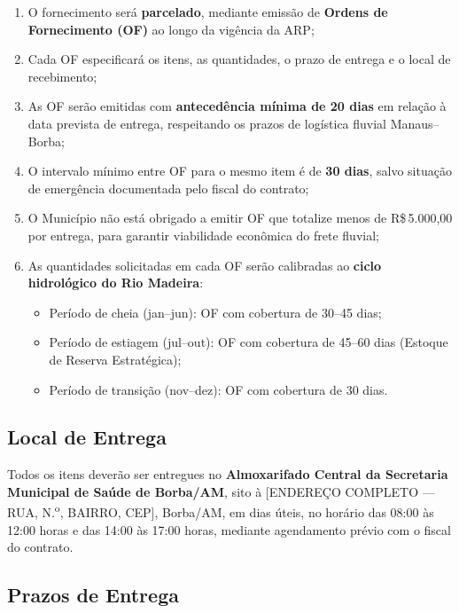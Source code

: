 \documentclass[12pt,a4paper]{article}
\newcommand{\Rs}{R\$\,}
\begin{document}
\begin{enumerate}
  \item O fornecimento será \textbf{parcelado}, mediante emissão de \textbf{Ordens de
    Fornecimento (OF)} ao longo da vigência da ARP;

  \item Cada OF especificará os itens, as quantidades, o prazo de entrega e o local de
    recebimento;

  \item As OF serão emitidas com \textbf{antecedência mínima de 20 dias} em relação à
    data prevista de entrega, respeitando os prazos de logística fluvial
    Manaus--Borba;

  \item O intervalo mínimo entre OF para o mesmo item é de \textbf{30 dias}, salvo
    situação de emergência documentada pelo fiscal do contrato;

  \item O Município não está obrigado a emitir OF que totalize menos de
    \Rs 5.000,00 por entrega, para garantir viabilidade econômica do frete fluvial;

  \item As quantidades solicitadas em cada OF serão calibradas ao \textbf{ciclo
    hidrológico do Rio Madeira}:
    \begin{itemize}
      \item Período de cheia (jan--jun): OF com cobertura de 30--45 dias;
      \item Período de estiagem (jul--out): OF com cobertura de 45--60 dias
        (Estoque de Reserva Estratégica);
      \item Período de transição (nov--dez): OF com cobertura de 30 dias.
    \end{itemize}
\end{enumerate}

\subsection{Local de Entrega}

Todos os itens deverão ser entregues no \textbf{Almoxarifado Central da Secretaria
Municipal de Saúde de Borba/AM}, sito à [ENDEREÇO COMPLETO --- RUA, N.\textsuperscript{o},
BAIRRO, CEP], Borba/AM, em dias úteis, no horário das 08:00 às 12:00 horas e das
14:00 às 17:00 horas, mediante agendamento prévio com o fiscal do contrato.

\subsection{Prazos de Entrega}
\end{document}
